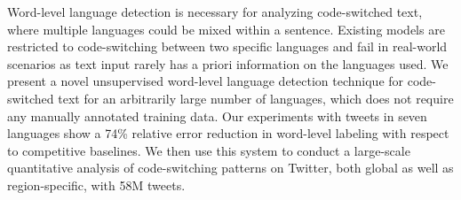 Word-level language detection is necessary for analyzing code-switched text, where multiple languages could be mixed within a sentence. Existing models are restricted to code-switching between two specific languages and fail in real-world scenarios as text input rarely has a priori information on the languages used. We present a novel unsupervised word-level language detection technique for code-switched text for an arbitrarily large number of languages, which does not require any manually annotated training data. Our experiments with tweets in seven languages show a 74\% relative error reduction in word-level labeling with respect to competitive baselines. We then use this system to conduct a large-scale quantitative analysis of code-switching patterns on Twitter, both global as well as region-specific, with 58M tweets.
